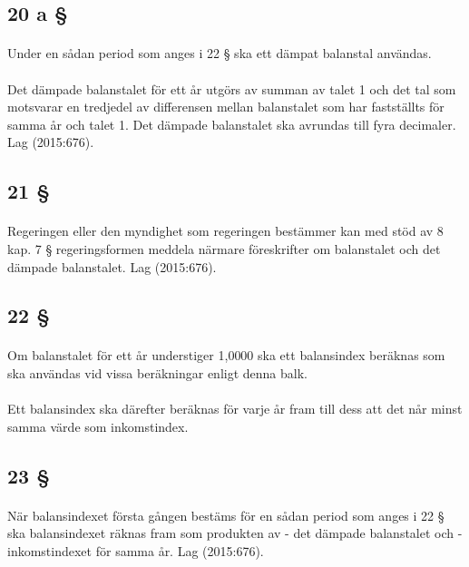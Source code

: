 \documentclass[a4paper,notitlepage,openany,10pt]{book}
\begin{document}
\subsection*{20 a §}
\paragraph*{}
Under en sådan period som anges i 22 § ska ett dämpat balanstal användas.
\paragraph*{}
Det dämpade balanstalet för ett år utgörs av summan av talet 1 och det tal som motsvarar en tredjedel av differensen mellan balanstalet som har fastställts för samma år och talet 1. Det dämpade balanstalet ska avrundas till fyra decimaler.
Lag (2015:676).
\subsection*{21 §}
\paragraph*{}
Regeringen eller den myndighet som regeringen bestämmer kan med stöd av 8 kap. 7 § regeringsformen meddela närmare föreskrifter om balanstalet och det dämpade balanstalet.
Lag (2015:676).
\subsection*{22 §}
\paragraph*{}
Om balanstalet för ett år understiger 1,0000 ska ett balansindex beräknas som ska användas vid vissa beräkningar enligt denna balk.
\paragraph*{}
Ett balansindex ska därefter beräknas för varje år fram till dess att det når minst samma värde som inkomstindex.
\subsection*{23 §}
\paragraph*{}
När balansindexet första gången bestäms för en sådan period som anges i 22 § ska balansindexet räknas fram som produkten av
\newline - det dämpade balanstalet och
\newline - inkomstindexet för samma år.
Lag (2015:676).
\end{document}
